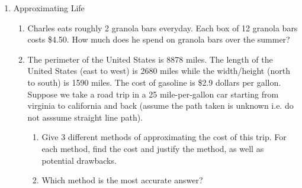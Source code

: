 \documentclass{article}
\begin{document}
\begin{enumerate}
    
    \item Approximating Life
    \begin{enumerate}
        \item Charles eats roughly 2 granola bars everyday. Each box of 12 granola bars costs \$4.50. How much does he spend on granola bars over the summer?
        \item The perimeter of the United States is 8878 miles. The length of the United States (east to west) is 2680 miles while the width/height (north to south) is 1590 miles. The cost of gasoline is \$2.9 dollars per gallon. Suppose we take a road trip in a 25 mile-per-gallon car starting from virginia to california and back (assume the path taken is unknown i.e. do not asssume straight line path). 
        \begin{enumerate}
            \item Give 3 different methods of approximating the cost of this trip. For each method, find the cost and justify the method, as well as potential drawbacks.
            \item Which method is the most accurate answer?
        \end{enumerate} 
    \end{enumerate}
    
\end{enumerate}
\end{document}
